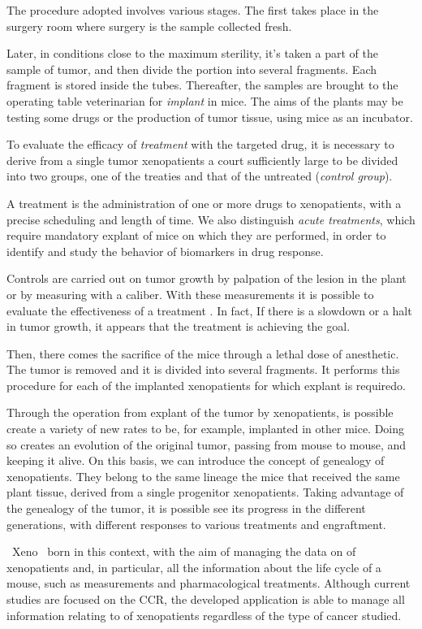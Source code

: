 The procedure adopted involves various stages. The first takes place in the surgery room where surgery is the sample collected fresh.

Later, in conditions close to the maximum sterility, it's taken a part of the sample of tumor, and then divide the portion into several fragments. Each fragment is stored inside the tubes. Thereafter, the samples are brought to the operating table veterinarian for \textit{implant} in mice. The aims of the plants may be testing some drugs or the production of tumor tissue, using mice as an incubator.

To evaluate the efficacy of \textit{treatment} with the targeted drug, it is necessary to derive from a single tumor xenopatients a court sufficiently large to be divided into two groups, one of the treaties and that of the untreated (\textit{control group}).

A treatment is the administration of one or more drugs to xenopatients, with a precise scheduling and length of time. We also distinguish \textit{acute treatments}, which require mandatory explant of mice on which they are performed, ​​in order to identify and study the behavior of biomarkers in drug response.

Controls are carried out on tumor growth by palpation of the lesion in the plant or by measuring with a caliber. With these measurements it is possible to evaluate the effectiveness of a treatment . In fact, If there is a slowdown or a halt in tumor growth, it appears that the treatment is achieving the goal.

Then, there comes the sacrifice of the mice through a lethal dose of anesthetic. The tumor is removed and it is divided into several fragments. It performs this procedure for each of the implanted xenopatients for which explant is requiredo.

Through the operation from explant of the tumor by xenopatients, is possible create a variety of new rates to be, for example, implanted in other mice. Doing so creates an evolution of the original tumor, passing from mouse to mouse, and keeping it alive. On this basis, we can introduce the concept of genealogy of xenopatients. They belong to the same lineage the mice that received the same plant tissue, derived from a single progenitor xenopatients. Taking advantage of the genealogy of the tumor, it is possible see its progress in the different generations, with different responses to various treatments and engraftment.

\ Xeno \ born in this context, with the aim of managing the data on of xenopatients and, in particular, all the information about the life cycle of a mouse, such as measurements and pharmacological treatments. Although current studies are focused on the CCR, the developed application is able to manage all information relating to of xenopatients regardless of the type of cancer studied.